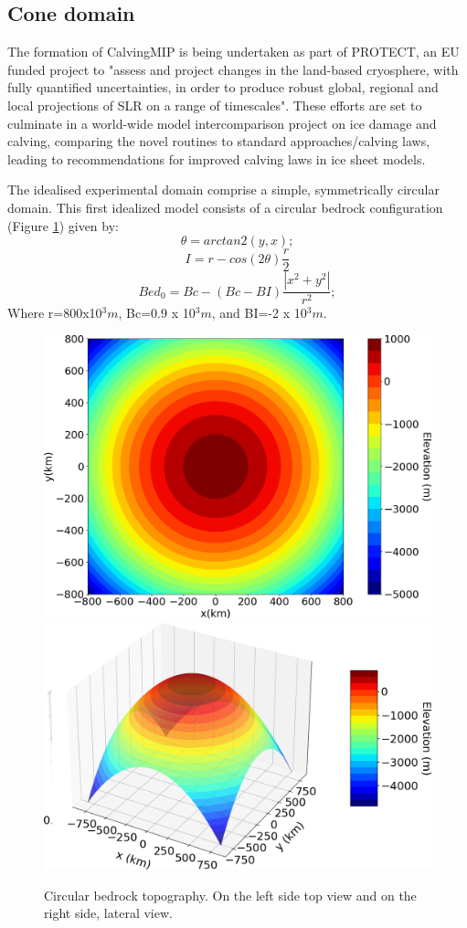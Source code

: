 \documentclass{article}
\begin{document}
\subsection{Cone domain}

The formation of CalvingMIP is being undertaken as part of PROTECT, an EU funded project to "assess and project changes in the land-based cryosphere, with fully quantified uncertainties, in order to produce robust global, regional and local projections of SLR on a range of timescales". These efforts are set to culminate in a world-wide model intercomparison project on ice damage and calving, comparing the novel routines to standard approaches/calving laws, leading to recommendations for improved calving laws in ice sheet models.

The idealised experimental domain comprise a simple, symmetrically circular domain. This first idealized model consists of a circular bedrock configuration (Figure \ref{circular_topo_top}) given by:
\begin{equation}
	\theta=arctan2(y,x);
\end{equation}
\begin{equation}
	I=r-cos(2\theta)\frac{r}{2}
\end{equation}
\begin{equation}
	Bed_0=Bc-(Bc-BI)\frac{|x^2+y^2|}{r^2};
\end{equation}
Where r=800x10$^3 m$, Bc=0.9 x 10$^3 m$, and BI=-2 x 10$^3 m$. 
\begin{figure}[!h]
	\centering
	\includegraphics[width=0.45\linewidth]{../fig/circular_topo_top.png}
	\includegraphics[width=0.45\linewidth]{../fig/circular_topo_jet}
	\caption{Circular bedrock topography. On the left side top view and on the right side, lateral view.}
	\label{circular_topo_top}
\end{figure}
\end{document}

